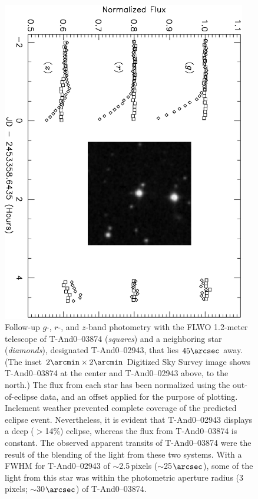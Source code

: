 \begin{figure}
\begin{center}
\includegraphics[angle=90, width=0.95\textwidth]{2_f6}
\caption[Follow-up photometry of \mbox{T-And0--03874}, a blended eclipsing binary]{
Follow-up $g$-, $r$-, and $z$-band photometry with the FLWO 1.2-meter telescope of \mbox{T-And0--03874} (\textit{squares}) and a neighboring star (\textit{diamonds}), designated \mbox{T-And0--02943}, that lies $45\arcsec$ away. (The inset $2\arcmin \times 2\arcmin$ Digitized Sky Survey image shows \mbox{T-And0--03874} at the center and \mbox{T-And0--02943} above, to the north.) %
The flux from each star has been normalized using the out-of-eclipse data, and an offset  applied for the purpose of plotting. Inclement weather prevented complete coverage of the predicted eclipse event. Nevertheless, it is evident that \mbox{T-And0--02943} displays a deep ($>$14\%) eclipse, whereas the flux from \mbox{T-And0--03874} is constant. The observed apparent transits of \mbox{T-And0--03874} were the result of the blending of the light from these two systems. With a FWHM for \mbox{T-And0--02943} of $\sim$2.5\,pixels ($\sim$25$\arcsec$), some of the light from this star was within the photometric aperture radius ($3$\,pixels; $\sim$30$\arcsec$) of \mbox{T-And0--03874}.}\label{cha:and0:fig:blend}
\end{center}
\end{figure}

